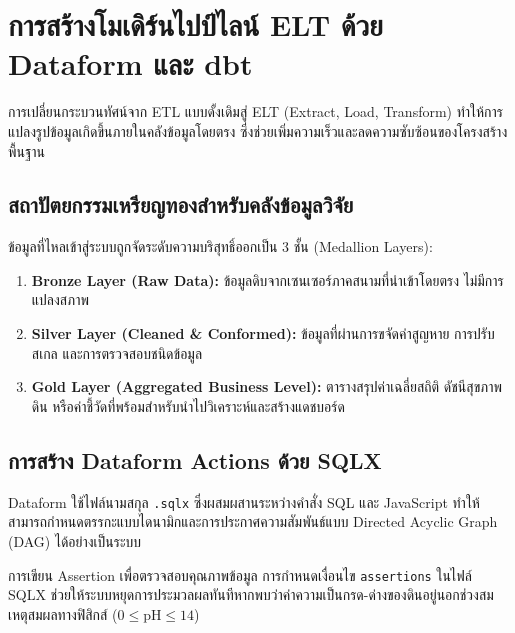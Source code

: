 \chapter{การสร้างโมเดิร์นไปป์ไลน์ ELT ด้วย Dataform และ dbt}

การเปลี่ยนกระบวนทัศน์จาก ETL แบบดั้งเดิมสู่ ELT (Extract, Load, Transform) ทำให้การแปลงรูปข้อมูลเกิดขึ้นภายในคลังข้อมูลโดยตรง ซึ่งช่วยเพิ่มความเร็วและลดความซับซ้อนของโครงสร้างพื้นฐาน

\section{สถาปัตยกรรมเหรียญทองสำหรับคลังข้อมูลวิจัย}

ข้อมูลที่ไหลเข้าสู่ระบบถูกจัดระดับความบริสุทธิ์ออกเป็น 3 ชั้น (Medallion Layers):
\begin{enumerate}
    \item \textbf{Bronze Layer (Raw Data):} ข้อมูลดิบจากเซนเซอร์ภาคสนามที่นำเข้าโดยตรง ไม่มีการแปลงสภาพ
    \item \textbf{Silver Layer (Cleaned \& Conformed):} ข้อมูลที่ผ่านการขจัดค่าสูญหาย การปรับสเกล และการตรวจสอบชนิดข้อมูล
    \item \textbf{Gold Layer (Aggregated Business Level):} ตารางสรุปค่าเฉลี่ยสถิติ ดัชนีสุขภาพดิน หรือค่าชี้วัดที่พร้อมสำหรับนำไปวิเคราะห์และสร้างแดชบอร์ด
\end{enumerate}

\section{การสร้าง Dataform Actions ด้วย SQLX}

Dataform ใช้ไฟล์นามสกุล \texttt{.sqlx} ซึ่งผสมผสานระหว่างคำสั่ง SQL และ JavaScript ทำให้สามารถกำหนดตรรกะแบบไดนามิกและการประกาศความสัมพันธ์แบบ Directed Acyclic Graph (DAG) ได้อย่างเป็นระบบ

\begin{activitybox}{การเขียน Assertion เพื่อตรวจสอบคุณภาพข้อมูล}
การกำหนดเงื่อนไข \texttt{assertions} ในไฟล์ SQLX ช่วยให้ระบบหยุดการประมวลผลทันทีหากพบว่าค่าความเป็นกรด-ด่างของดินอยู่นอกช่วงสมเหตุสมผลทางฟิสิกส์ ($0 \le \text{pH} \le 14$)
\end{activitybox}
